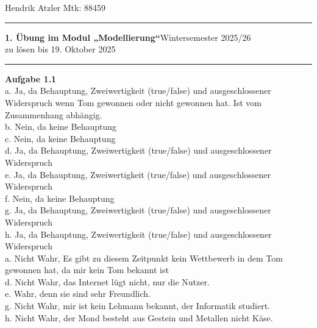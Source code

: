 \documentclass[a4paper,12pt]{article}
\begin{document}
Hendrik Atzler \hfill Mtk: 88459

\rule{\textwidth}{0.4pt}


{\textbf{1. Übung im Modul „Modellierung“}\hfill Wintersemester 2025/26} \\
zu lösen bis 19. Oktober 2025 \\
\rule{\textwidth}{0.4pt}

{\large{\textbf{Aufgabe 1.1}}} \\

a. Ja, da Behauptung, Zweiwertigkeit (true/false) und ausgeschlossener Widerspruch wenn Tom gewonnen oder nicht gewonnen hat. Ist vom Zusammenhang abhängig. \\
b. Nein, da keine Behauptung \\
c. Nein, da keine Behauptung \\
d. Ja, da Behauptung, Zweiwertigkeit (true/false) und ausgeschlossener Widerspruch \\
e. Ja, da Behauptung, Zweiwertigkeit (true/false) und ausgeschlossener Widerspruch \\
f. Nein, da keine Behauptung \\
g. Ja, da Behauptung, Zweiwertigkeit (true/false) und ausgeschlossener Widerspruch \\
h. Ja, da Behauptung, Zweiwertigkeit (true/false) und ausgeschlossener Widerspruch \\


a. Nicht Wahr, Es gibt zu diesem Zeitpunkt kein Wettbewerb in dem Tom gewonnen hat, da mir kein Tom bekannt ist \\
d. Nicht Wahr, das Internet lügt nicht, nur die Nutzer. \\
e. Wahr, denn sie sind sehr Freundlich. \\
g. Nicht Wahr, mir ist kein Lehmann bekannt, der Informatik studiert. \\
h. Nicht Wahr, der Mond besteht aus Gestein und Metallen nicht Käse. \\
\end{document}
